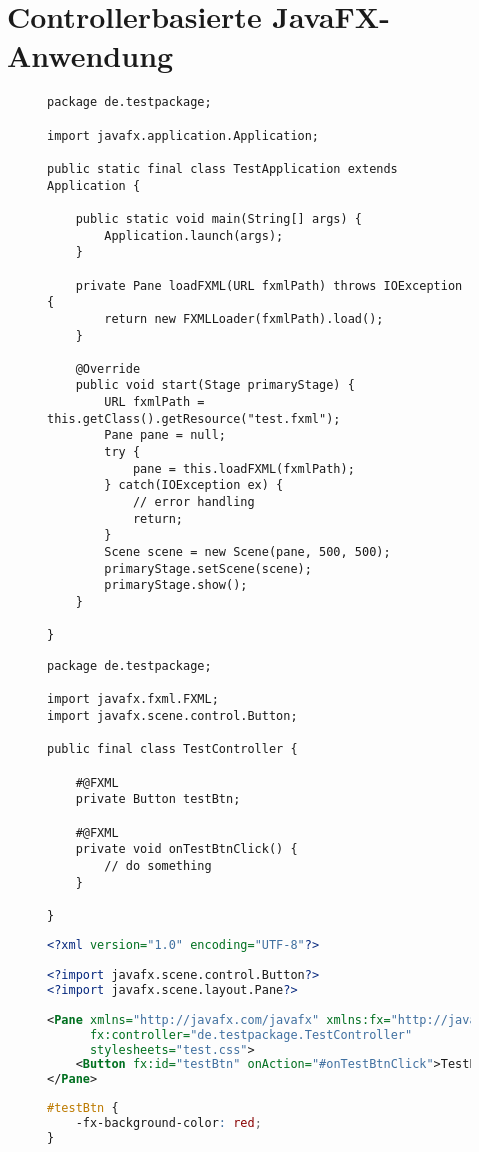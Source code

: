 \chapter{Controllerbasierte JavaFX-Anwendung}
\label{appendix:controllerbased_javafx_application}
\begin{figure}
	\begin{lstlisting}[caption={Anwendungscode.}, captionpos=b, nolol]
package de.testpackage;
		
import javafx.application.Application;
		
public static final class TestApplication extends Application {
			
	public static void main(String[] args) {
		Application.launch(args);
	}
			
	private Pane loadFXML(URL fxmlPath) throws IOException {
		return new FXMLLoader(fxmlPath).load();
	}
			
	@Override
	public void start(Stage primaryStage) {
		URL fxmlPath = this.getClass().getResource("test.fxml");
		Pane pane = null;
		try {
			pane = this.loadFXML(fxmlPath);
		} catch(IOException ex) {
			// error handling
			return;
		}
		Scene scene = new Scene(pane, 500, 500);
		primaryStage.setScene(scene);
		primaryStage.show();
	}
			
}
	\end{lstlisting}
\end{figure}
\begin{figure}
	\begin{lstlisting}[caption={Beispielcontroller.}, captionpos=b, nolol]
package de.testpackage;

import javafx.fxml.FXML;
import javafx.scene.control.Button;

public final class TestController {

	#@FXML
	private Button testBtn;

	#@FXML
	private void onTestBtnClick() {
		// do something
	}

}
	\end{lstlisting}
\end{figure}
\begin{figure}
	\begin{lstlisting}[caption={FXML-Layout.}, captionpos=b, nolol, language=XML]
<?xml version="1.0" encoding="UTF-8"?>
	
<?import javafx.scene.control.Button?>
<?import javafx.scene.layout.Pane?>
	
<Pane xmlns="http://javafx.com/javafx" xmlns:fx="http://javafx.com/fxml"
	  fx:controller="de.testpackage.TestController"
	  stylesheets="test.css">
	<Button fx:id="testBtn" onAction="#onTestBtnClick">TestButton</Button>
</Pane>
	\end{lstlisting}
\end{figure}
\begin{figure}
	\begin{lstlisting}[caption={CSS-Design.}, captionpos=b, nolol, language=CSS]
#testBtn {
	-fx-background-color: red;
}
	\end{lstlisting}
\end{figure}